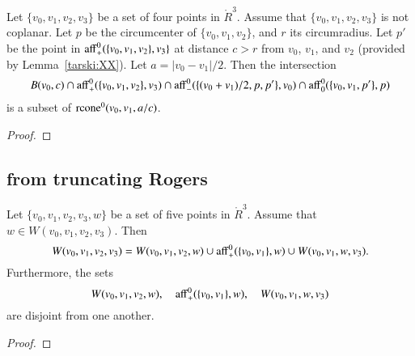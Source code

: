\begin{tarskidata}
\begin{tarski}

\begin{lemma}
Let $\{v_0,v_1,v_2,v_3\}$ be a set of four points in $\ring{R}^3$.
Assume that $\{v_0,v_1,v_2,v_3\}$ is not coplanar.  Let $p$
be the circumcenter of $\{v_0,v_1,v_2\}$, and $r$ its circumradius.  
Let $p'$ be the
point in ${\operatorname{aff}}_+^0(\{v_0,v_1,v_2\},v_3\}$ at distance
$c > r$ from $v_0$, $v_1$, and $v_2$ (provided by Lemma~\ref{tarski:XX}).
Let $a = |v_0-v_1|/2$.
Then the intersection
  $$
  B(v_0,c)\cap
  {\operatorname{aff}}^0_+(\{v_0,v_1,v_2\},v_3) \cap
  {\operatorname{aff}}^0_-(\{(v_0+v_1)/2,p,p' \},v_0) \cap
  {\operatorname{aff}}^0_0(\{v_0,v_1,p'\},p)
  $$
is a subset of ${\operatorname{rcone}}^0(v_0,v_1,a/c)$.
\end{lemma}

\begin{proof}
\end{proof}
\end{tarski}







\begin{tarski}
\subsection{from truncating Rogers}

\begin{lemma}
Let $\{v_0,v_1,v_2,v_3,w\}$ be a set of five points in $\ring{R}^3$.
Assume that $w\in W(v_0,v_1,v_2,v_3)$. Then
$$
W(v_0,v_1,v_2,v_3) = W(v_0,v_1,v_2,w) \cup {\operatorname{aff}}_+^0(\{v_0,v_1\},w)
\cup W(v_0,v_1,w,v_3).
$$
Furthermore, the sets
$$
W(v_0,v_1,v_2,w),\quad {\operatorname{aff}}_+^0(\{v_0,v_1\},w),\quad
W(v_0,v_1,w,v_3)
$$
are disjoint from one another.
\end{lemma}

\begin{proof}
\end{proof}
\end{tarski}






\end{tarskidata}
